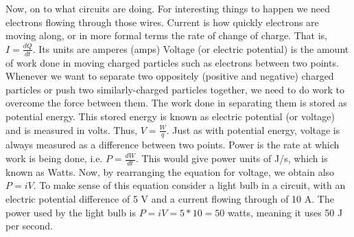 \documentclass[nobib]{tufte-handout}
\begin{document}
Now, on to what circuits are doing. For interesting things
to happen we need electrons flowing through those wires.
Current is how quickly
electrons are moving along, or in more formal terms the rate of
change of charge. That is, $I = \frac{dQ}{dt}$. Its units are amperes (amps)
Voltage (or electric potential) is the amount of work done in moving charged 
particles such as electrons between two points. Whenever we want to separate 
two oppositely (positive and negative) charged particles or push two similarly-charged
particles together, we need to do
work to overcome the force between them. The work done in 
separating them is stored as potential energy.
This stored energy is known as electric potential (or voltage) and is measured in volts.
Thus, $V = \frac{W}{q}$. Just as with potential energy, voltage is always 
measured as a difference between two points. Power is the rate at which work is being done,
i.e. $P = \frac{dW}{dt}$. This would give power units of J/s, which
is known as Watts. Now, by rearranging the equation for voltage, we obtain also
$P=iV$. To make sense of this equation consider a light bulb in a circuit, with an electric potential difference of
5 V and a current flowing through of 10 A. The power used by the light bulb is 
$P=iV = 5 * 10 = 50$ watts, meaning it uses 50 J per second. 
\end{document}

